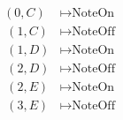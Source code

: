 \documentclass[preview]{standalone}
\begin{document}
\begin{align*}
(0,C) & \mapsto \text{NoteOn} \\ \
        (1,C) & \mapsto \text{NoteOff} \\ \
        (1,D) & \mapsto \text{NoteOn} \\ \
        (2,D) & \mapsto \text{NoteOff} \\ \
        (2,E) & \mapsto \text{NoteOn} \\ \
        (3,E) & \mapsto \text{NoteOff} \\
\end{align*}
\end{document}
